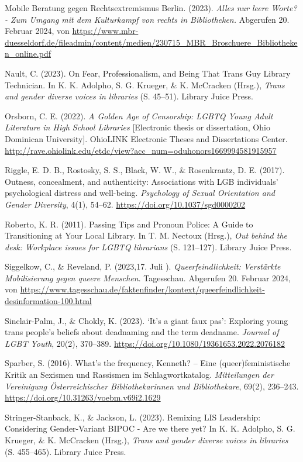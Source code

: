 \documentclass[a4paper,
fontsize=11pt,
oneside,
numbers=noperiodatend,
parskip=half-,
bibliography=totoc,
final
]{scrartcl}
\begin{document}
Mobile Beratung gegen Rechtsextremismus Berlin. (2023). \emph{Alles nur
leere Worte? - Zum Umgang mit dem Kulturkampf von rechts in
Bibliotheken.} Abgerufen 20. Februar 2024, von
\url{https://www.mbr-duesseldorf.de/fileadmin/content/medien/230715_MBR_Broschuere_Bibliotheken_online.pdf}

Nault, C. (2023). On Fear, Professionalism, and Being That Trans Guy
Library Technician. In K. K. Adolpho, S. G. Krueger, \& K. McCracken
(Hrsg.), \emph{Trans and gender diverse voices in libraries} (S.
45--51). Library Juice Press.

Orsborn, C. E. (2022). \emph{A Golden Age of Censorship: LGBTQ Young
Adult Literature in High School Libraries} {[}Electronic thesis or
dissertation, Ohio Dominican University{]}. OhioLINK Electronic Theses
and Dissertations Center.
\url{http://rave.ohiolink.edu/etdc/view?acc_num=oduhonors1669994581915957}

Riggle, E. D. B., Rostosky, S. S., Black, W. W., \& Rosenkrantz, D. E.
(2017). Outness, concealment, and authenticity: Associations with LGB
individuals' psychological distress and well-being. \emph{Psychology of
Sexual Orientation and Gender Diversity}, 4(1), 54--62.
\url{https://doi.org/10.1037/sgd0000202}

Roberto, K. R. (2011). Passing Tips and Pronoun Police: A Guide to
Transitioning at Your Local Library. In T. M. Nectoux (Hrsg.), \emph{Out
behind the desk: Workplace issues for LGBTQ librarians} (S. 121--127).
Library Juice Press.

Siggelkow, C., \& Reveland, P. (2023,17. Juli ).
\emph{Queerfeindlichkeit: Verstärkte Mobilisierung gegen queere
Menschen}. Tagesschau. Abgerufen 20. Februar 2024, von
\url{https://www.tagesschau.de/faktenfinder/kontext/queerfeindlichkeit-desinformation-100.html}

Sinclair-Palm, J., \& Chokly, K. (2023). \enquote*{It's a giant faux
pas}: Exploring young trans people's beliefs about deadnaming and the
term deadname. \emph{Journal of LGBT Youth}, 20(2), 370--389.
\url{https://doi.org/10.1080/19361653.2022.2076182}

Sparber, S. (2016). What's the frequency, Kenneth? -- Eine
(queer)feministische Kritik an Sexismen und Rassismen im
Schlagwortkatalog. \emph{Mitteilungen der Vereinigung Österreichischer
Bibliothekarinnen und Bibliothekare}, 69(2), 236--243.
\url{https://doi.org/10.31263/voebm.v69i2.1629}

Stringer-Stanback, K., \& Jackson, L. (2023). Remixing LIS Leadership:
Considering Gender-Variant BIPOC - Are we there yet? In K. K. Adolpho,
S. G. Krueger, \& K. McCracken (Hrsg.), \emph{Trans and gender diverse
voices in libraries} (S. 455--465). Library Juice Press.
\end{document}
